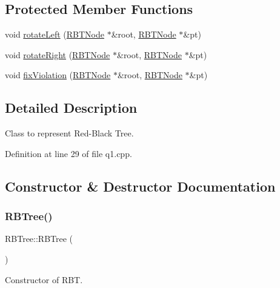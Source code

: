 \subsection*{Protected Member Functions}
\begin{DoxyCompactItemize}
\item 
void \hyperlink{class_r_b_tree_a270245764ca4bafce48daa2814841b14}{rotate\+Left} (\hyperlink{struct_r_b_t_node}{R\+B\+T\+Node} $\ast$\&root, \hyperlink{struct_r_b_t_node}{R\+B\+T\+Node} $\ast$\&pt)
\item 
void \hyperlink{class_r_b_tree_a9843ddcab67030b508032eeb991d4714}{rotate\+Right} (\hyperlink{struct_r_b_t_node}{R\+B\+T\+Node} $\ast$\&root, \hyperlink{struct_r_b_t_node}{R\+B\+T\+Node} $\ast$\&pt)
\item 
void \hyperlink{class_r_b_tree_a5052e46871a174091018381a92b35728}{fix\+Violation} (\hyperlink{struct_r_b_t_node}{R\+B\+T\+Node} $\ast$\&root, \hyperlink{struct_r_b_t_node}{R\+B\+T\+Node} $\ast$\&pt)
\end{DoxyCompactItemize}


\subsection{Detailed Description}
Class to represent Red-\/\+Black Tree. 

Definition at line 29 of file q1.\+cpp.



\subsection{Constructor \& Destructor Documentation}
\mbox{\label{class_r_b_tree_a19921f34f32f777bb3c4b85d4ff1d9de}} 
\subsubsection{\texorpdfstring{R\+B\+Tree()}{RBTree()}}
{\footnotesize\ttfamily R\+B\+Tree\+::\+R\+B\+Tree (\begin{DoxyParamCaption}{ }\end{DoxyParamCaption})\hspace{0.3cm}{\ttfamily [inline]}}



Constructor of R\+BT. 



